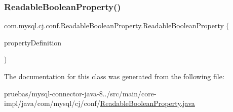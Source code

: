 \subsubsection{\texorpdfstring{Readable\+Boolean\+Property()}{ReadableBooleanProperty()}}
{\footnotesize\ttfamily com.\+mysql.\+cj.\+conf.\+Readable\+Boolean\+Property.\+Readable\+Boolean\+Property (\begin{DoxyParamCaption}\item[{\mbox{\hyperlink{interfacecom_1_1mysql_1_1cj_1_1conf_1_1_property_definition}{Property\+Definition}}$<$ Boolean $>$}]{property\+Definition }\end{DoxyParamCaption})\hspace{0.3cm}{\ttfamily [protected]}}



The documentation for this class was generated from the following file\+:\begin{DoxyCompactItemize}
\item 
pruebas/mysql-\/connector-\/java-\/8../src/main/core-\/impl/java/com/mysql/cj/conf/\mbox{\hyperlink{_readable_boolean_property_8java}{Readable\+Boolean\+Property.\+java}}\end{DoxyCompactItemize}
